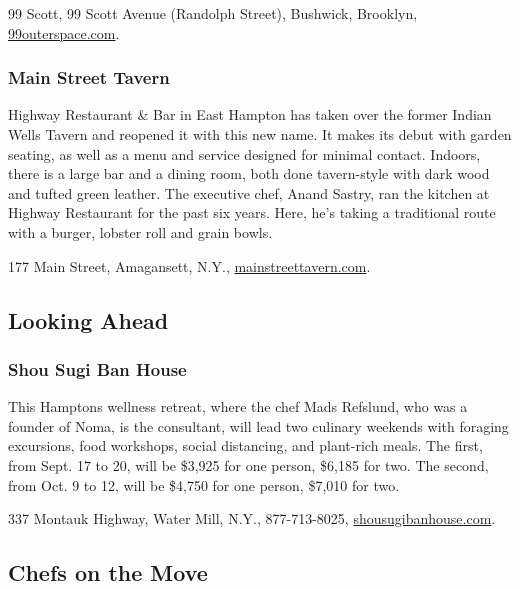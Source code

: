 99 Scott, 99 Scott Avenue (Randolph Street), Bushwick, Brooklyn,
\href{https://99outerspace.com}{99outerspace.com}.

\hypertarget{main-street-tavern-}{%
\subsubsection{Main Street Tavern }\label{main-street-tavern-}}

Highway Restaurant \& Bar in East Hampton has taken over the former
Indian Wells Tavern and reopened it with this new name. It makes its
debut with garden seating, as well as a menu and service designed for
minimal contact. Indoors, there is a large bar and a dining room, both
done tavern-style with dark wood and tufted green leather. The executive
chef, Anand Sastry, ran the kitchen at Highway Restaurant for the past
six years. Here, he's taking a traditional route with a burger, lobster
roll and grain bowls.

177 Main Street, Amagansett, N.Y.,
\href{https://www.mainstreettavern.com/}{mainstreettavern.com}.

\hypertarget{looking-ahead}{%
\subsection{Looking Ahead}\label{looking-ahead}}

\hypertarget{shou-sugi-ban-house-}{%
\subsubsection{Shou Sugi Ban House }\label{shou-sugi-ban-house-}}

This Hamptons wellness retreat, where the chef Mads Refslund, who was a
founder of Noma, is the consultant, will lead two culinary weekends with
foraging excursions, food workshops, social distancing, and plant-rich
meals. The first, from Sept. 17 to 20, will be \$3,925 for one person,
\$6,185 for two. The second, from Oct. 9 to 12, will be \$4,750 for one
person, \$7,010 for two.

337 Montauk Highway, Water Mill, N.Y., 877-713-8025,
\href{https://shousugibanhouse.com/}{shousugibanhouse.com}.

\hypertarget{chefs-on-the-move}{%
\subsection{Chefs on the Move}\label{chefs-on-the-move}}


